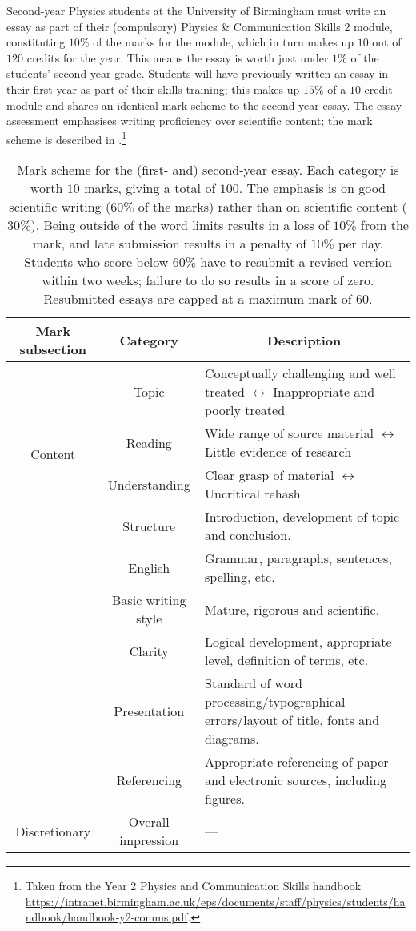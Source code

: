 Second-year Physics students at the University of Birmingham must write an essay as part of their (compulsory) Physics \& Communication Skills 2 module, constituting $10\%$ of the marks for the module, which in turn makes up $10$ out of $120$ credits for the year. This means the essay is worth just under $1\%$ of the students' second-year grade. Students will have previously written an essay in their first year as part of their skills training; this makes up $15\%$ of a $10$ credit module and shares an identical mark scheme to the second-year essay. The essay assessment emphasises writing proficiency over scientific content; the mark scheme is described in .\footnote{Taken from the Year 2 Physics and Communication Skills handbook \url{https://intranet.birmingham.ac.uk/eps/documents/staff/physics/students/handbook/handbook-y2-comms.pdf}.}
\begin{table}\scriptsize
\centering
\begin{tabular}{c c p{3in}}
\toprule
\multicolumn{1}{c}{Mark subsection} & \multicolumn{1}{c}{Category} & \multicolumn{1}{c}{Description} \\
\midrule 
\multirow{4}{*}{Content} & \multirow{1}{*}{Topic}  & Conceptually challenging and well treated $\leftrightarrow$ Inappropriate and poorly treated \\
			 & Reading	  & Wide range of source material $\leftrightarrow$ Little evidence of research \\
			 & Understanding  & Clear grasp of material $\leftrightarrow$ Uncritical rehash \\
\midrule
\multirow{9}{*}{Style}	 & Structure 	  & Introduction, development of topic and conclusion. \\
			 & English  	  & Grammar, paragraphs, sentences, spelling, etc. \\
			 & Basic writing style  & Mature, rigorous and scientific. \\
			 & \multirow{1}{*}{Clarity}  & Logical development, appropriate level, definition of terms, etc. \\
			 & \multirow{1}{*}{Presentation}  & Standard of word processing/typographical errors/layout of title, fonts and diagrams. \\
			 & \multirow{1}{*}{Referencing}  & Appropriate referencing of paper and electronic sources, including figures. \\
\midrule
\multirow{1}{*}{Discretionary}	 & Overall impression & --- \\
 \bottomrule
\end{tabular}
\caption{Mark scheme for the (first- and) second-year essay. Each category is worth $10$ marks, giving a total of $100$. The emphasis is on good scientific writing ($60\%$ of the marks) rather than on scientific content ($30\%$). Being outside of the word limits results in a loss of $10\%$ from the mark, and late submission results in a penalty of $10\%$ per day. Students who score below $60\%$ have to resubmit a revised version within two weeks; failure to do so results in a score of zero. Resubmitted essays are capped at a maximum mark of $60$.}\label{tab:mark-scheme}
\end{table}

